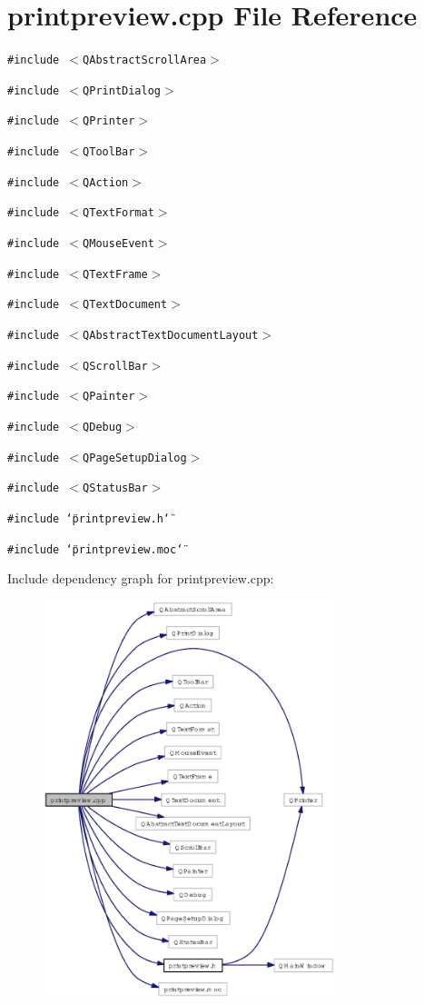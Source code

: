 \section{printpreview.cpp File Reference}
\label{printpreview_8cpp}
{\tt \#include $<$QAbstract\-Scroll\-Area$>$}\par
{\tt \#include $<$QPrint\-Dialog$>$}\par
{\tt \#include $<$QPrinter$>$}\par
{\tt \#include $<$QTool\-Bar$>$}\par
{\tt \#include $<$QAction$>$}\par
{\tt \#include $<$QText\-Format$>$}\par
{\tt \#include $<$QMouse\-Event$>$}\par
{\tt \#include $<$QText\-Frame$>$}\par
{\tt \#include $<$QText\-Document$>$}\par
{\tt \#include $<$QAbstract\-Text\-Document\-Layout$>$}\par
{\tt \#include $<$QScroll\-Bar$>$}\par
{\tt \#include $<$QPainter$>$}\par
{\tt \#include $<$QDebug$>$}\par
{\tt \#include $<$QPage\-Setup\-Dialog$>$}\par
{\tt \#include $<$QStatus\-Bar$>$}\par
{\tt \#include \char`\"{}printpreview.h\char`\"{}}\par
{\tt \#include \char`\"{}printpreview.moc\char`\"{}}\par


Include dependency graph for printpreview.cpp:\begin{figure}[H]
\begin{center}
\leavevmode
\includegraphics[width=241pt]{printpreview_8cpp__incl}
\end{center}
\end{figure}
